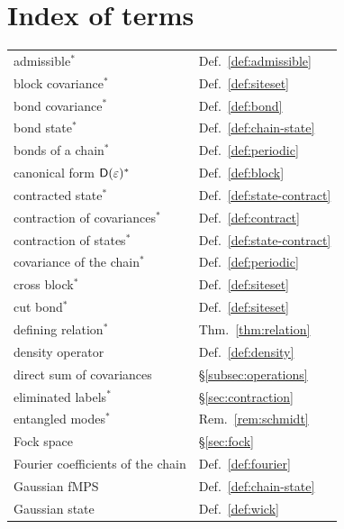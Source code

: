 \clearpage
\section*{Index of terms}

\noindent{}

\medskip
{\small
\noindent\begin{minipage}[t]{0.49\textwidth}
\begin{tabular}[t]{@{}l@{\quad}l@{}}
admissible$^*$ & Def.~\ref{def:admissible}\\
block covariance$^*$ & Def.~\ref{def:siteset}\\
bond covariance$^*$ & Def.~\ref{def:bond}\\
bond state$^*$ & Def.~\ref{def:chain-state}\\
bonds of a chain$^*$ & Def.~\ref{def:periodic}\\
canonical form $\mathsf D(\varepsilon)^*$ & Def.~\ref{def:block}\\
contracted state$^*$ & Def.~\ref{def:state-contract}\\
contraction of covariances$^*$ & Def.~\ref{def:contract}\\
contraction of states$^*$ & Def.~\ref{def:state-contract}\\
covariance of the chain$^*$ & Def.~\ref{def:periodic}\\
cross block$^*$ & Def.~\ref{def:siteset}\\
cut bond$^*$ & Def.~\ref{def:siteset}\\
defining relation$^*$ & Thm.~\ref{thm:relation}\\
density operator & Def.~\ref{def:density}\\
direct sum of covariances & \S\ref{subsec:operations}\\
eliminated labels$^*$ & \S\ref{sec:contraction}\\
entangled modes$^*$ & Rem.~\ref{rem:schmidt}\\
Fock space & \S\ref{sec:fock}\\
Fourier coefficients of the chain & Def.~\ref{def:fourier}\\
Gaussian fMPS & Def.~\ref{def:chain-state}\\
Gaussian state & Def.~\ref{def:wick}\\

\end{tabular}
\end{minipage}}
